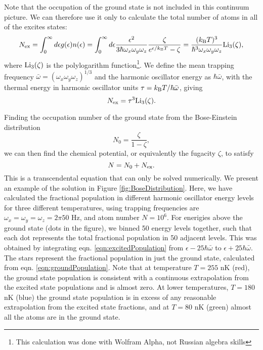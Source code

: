 Note that the occupation of the ground state is not included in this continuum picture. We can therefore use it only to calculate the total number of atoms in all of the excites states:
\begin{equation}
N_{\rm ex} = \int_0^{\infty} d\epsilon g(\epsilon) n(\epsilon) = \int_0^{\infty} d\epsilon \frac{\epsilon^2}{3\hbar\omega_x \omega_y \omega_z} \frac{\zeta}{e^{\epsilon/k_{\rm B}T}-\zeta} = \frac{(k_{\rm B}T)^3}{\hbar^3\omega_x \omega_y \omega_z}{\rm Li}_3(\zeta),
\label{eqn:excitedPopulation}
\end{equation}
where ${\rm Li}_3(\zeta)$ is the polylogarithm function\footnote{This calculation was done with Wolfram Alpha, not Russian algebra skills}. 
We define the mean trapping frequency $\bar{\omega} = (\omega_x \omega_y \omega_z)^{1/3}$ and the harmonic oscillator energy as $\hbar\bar{\omega}$, with the thermal energy in harmonic oscillator units $\tau = k_{\rm B}T/\hbar\bar{\omega}$, giving
\begin{equation}
N_{\rm ex} = \tau^3 {\rm Li}_3(\zeta).
\end{equation}

Finding the occupation number of the ground state from the Bose-Einstein distribution
\begin{equation}
N_0 = \frac{\zeta}{1-\zeta},
\label{eqn:groundPopulation}
\end{equation}
we can then find the chemical potential, or equivalently the fugacity $\zeta$, to satisfy
\begin{equation}
N = N_0 + N_{\rm ex}.
\end{equation}
This is a transcendental equation that can only be solved numerically. We present an example of the solution in Figure \ref{fig:BoseDistribution}. Here, we have calculated the fractional population in different harmonic oscillator energy levels for three different temperatures, using trapping frequencies are $\omega_x=\omega_y=\omega_z=2\pi 50$ Hz, and atom number $N=10^6$. For enerigies above the ground state (dots in the figure), we binned 50 energy levels together, such that each dot represents the total fractional population in 50 adjacent levels. This was obtained by integrating eqn. \ref{eqn:excitedPopulation} from $\epsilon - 25\hbar\bar{\omega}$ to $\epsilon + 25\hbar\bar{\omega}$. The stars represent the fractional population in just the ground state, calculated from eqn. \ref{eqn:groundPopulation}. Note that at temperature $T=255$ nK (red), the ground state population is consistent with a continuous extrapolation from the excited state populations and is almost zero. At lower temperatures, $T=180$ nK (blue) the ground state population is in excess of any reasonable extrapolation from the excited state fractions, and at $T=80$ nK (green) almost all the atoms are in the ground state. 

